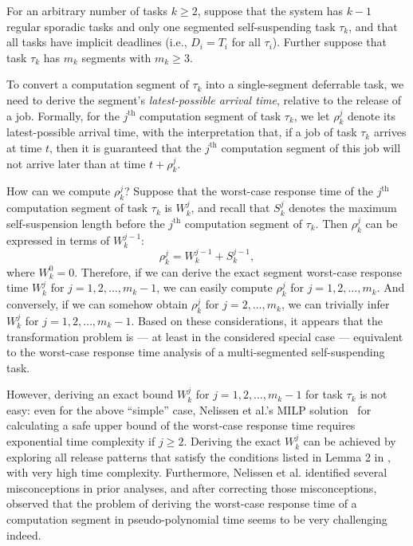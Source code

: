 For an arbitrary number of tasks $k \geq 2$, 
suppose that the system has $k-1$ regular sporadic tasks and only one segmented self-suspending task $\tau_k$, and that all tasks have implicit deadlines (i.e., $D_i = T_i$ for all $\tau_i$). Further suppose that task $\tau_k$ has $m_k$ segments with $m_k \geq 3$.  

To  convert a computation segment of $\tau_k$ into a single-segment deferrable task, we need to derive the segment's \emph{latest-possible arrival time}, relative to the release of a job. Formally,  for the $j^{\mathrm{th}}$ computation segment of task $\tau_k$, we let $\rho_k^j$ denote its latest-possible arrival time, with the interpretation that, if a job of task $\tau_k$ arrives at time $t$, then  it is guaranteed that the $j^{\mathrm{th}}$ computation segment of this job will not arrive later than at time $t+\rho_k^j$.

How can we compute $\rho_k^j$? Suppose that the worst-case response time of the $j^{\mathrm{th}}$ computation segment of task $\tau_k$ is $W_k^j$, and recall that $S_k^{j}$ denotes the maximum self-suspension length before the $j^{\mathrm{th}}$ computation segment of $\tau_k$. Then $\rho_k^j$ can be expressed in terms of $W_k^{j-1}$:
$$
	\rho_k^j = W_k^{j-1}+S_k^{j-1},
$$
where $W_k^0 = 0$.  Therefore, if we can derive the exact segment worst-case response time $W_k^j$ for $j=1,2,\ldots,m_k-1$, we can easily compute $\rho_k^j$  for $j=1,2,\ldots,m_k$. And conversely, if we can somehow obtain $\rho_k^j$  for $j=2,\ldots,m_k$, we  can trivially infer $W_k^j$ for $j=1,2,\ldots,m_k-1$.
Based on these considerations, it appears that the transformation problem is  --- at least in the considered special case --- equivalent to the  worst-case response time analysis of a multi-segmented self-suspending task. 

However, deriving an exact bound $W_k^j$ for $j=1,2,\ldots,m_k-1$ for task $\tau_k$ is not easy: 
even for the above ``simple'' case, Nelissen et al.'s MILP solution~\cite{ecrts15nelissen} for calculating a safe upper bound of the worst-case response time requires exponential time complexity if $j \geq 2$. 
Deriving the exact $W_k^j$ can be achieved by exploring all  release patterns that satisfy the conditions listed in Lemma 2 in \cite{ecrts15nelissen}, with very high time complexity. 
Furthermore, Nelissen et al. \cite{ecrts15nelissen} identified several misconceptions in prior analyses, and after correcting those misconceptions, observed that the problem of deriving the worst-case response time of a computation segment in pseudo-polynomial time seems to be very challenging indeed.

